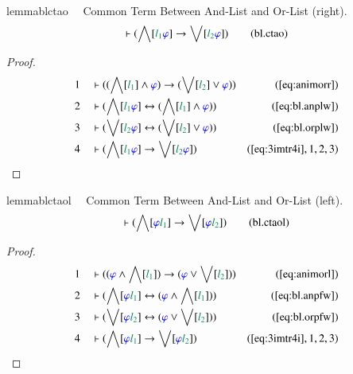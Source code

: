 \begin{restatable}{lemma}{blctao}~~ Common Term Between And-List and Or-List
(right).
\begin{align}
\vdash ( \bigwedge[ \mwl{l_1} \mw{\varphi} ] \rightarrow \bigvee[ \mwl{l_2}
    \mw{\varphi} ] )\label{eq:bl.ctao}\tag{bl.ctao}
\end{align}
\end{restatable}

\begin{proof}
\begin{align}
  1 &&  & \vdash ( ( \bigwedge[ \mwl{l_1} ] \wedge \mw{\varphi} ) \rightarrow (
      \bigvee[ \mwl{l_2} ] \vee \mw{\varphi} )
      )&(\mbox{\ref{eq:animorr}})\notag
  \\ 2 &&  & \vdash ( \bigwedge[ \mwl{l_1} \mw{\varphi} ] \leftrightarrow (
      \bigwedge[ \mwl{l_1} ] \wedge \mw{\varphi} )
      )&(\mbox{\ref{eq:bl.anplw}})\notag
  \\ 3 &&  & \vdash ( \bigvee[ \mwl{l_2} \mw{\varphi} ] \leftrightarrow (
      \bigvee[ \mwl{l_2} ] \vee \mw{\varphi} )
      )&(\mbox{\ref{eq:bl.orplw}})\notag
  \\ 4 &&  & \vdash ( \bigwedge[ \mwl{l_1} \mw{\varphi} ] \rightarrow \bigvee[
      \mwl{l_2} \mw{\varphi} ]
      )&(\mbox{\ref{eq:3imtr4i}},1,2,3)\notag
\end{align}
\end{proof}

\begin{restatable}{lemma}{blctaol}~~ Common Term Between And-List and Or-List
(left).
\begin{align}
\vdash ( \bigwedge[ \mw{\varphi} \mwl{l_1} ] \rightarrow \bigvee[ \mw{\varphi}
    \mwl{l_2} ] )\label{eq:bl.ctaol}\tag{bl.ctaol}
\end{align}
\end{restatable}

\begin{proof}
\begin{align}
  1 &&  & \vdash ( ( \mw{\varphi} \wedge \bigwedge[ \mwl{l_1} ] ) \rightarrow (
      \mw{\varphi} \vee \bigvee[ \mwl{l_2} ] )
      )&(\mbox{\ref{eq:animorl}})\notag
  \\ 2 &&  & \vdash ( \bigwedge[ \mw{\varphi} \mwl{l_1} ] \leftrightarrow (
      \mw{\varphi} \wedge \bigwedge[ \mwl{l_1} ] )
      )&(\mbox{\ref{eq:bl.anpfw}})\notag
  \\ 3 &&  & \vdash ( \bigvee[ \mw{\varphi} \mwl{l_2} ] \leftrightarrow (
      \mw{\varphi} \vee \bigvee[ \mwl{l_2} ] )
      )&(\mbox{\ref{eq:bl.orpfw}})\notag
  \\ 4 &&  & \vdash ( \bigwedge[ \mw{\varphi} \mwl{l_1} ] \rightarrow \bigvee[
      \mw{\varphi} \mwl{l_2} ]
      )&(\mbox{\ref{eq:3imtr4i}},1,2,3)\notag
\end{align}
\end{proof}

